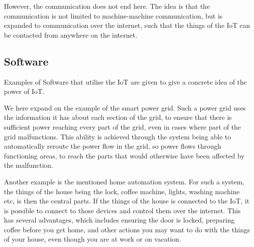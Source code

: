 However, the communication does not end here.
The idea is that the communication is not limited to machine-machine communication, but is expanded to communication over the internet, such that the things of the IoT can be contacted from anywhere on the internet.

\subsection{Software}
Examples of Software that utilise the IoT are given to give a concrete idea of the power of IoT.

We here expand on the example of the smart power grid.
Such a power grid uses the information it has about each section of the grid, to ensure that there is sufficient power reaching every part of the grid, even in cases where part of the grid malfunctions.
This ability is achieved through the system being able to automatically reroute the power flow in the grid, so power flows through functioning areas, to reach the parts that would otherwise have been affected by the malfunction.

Another example is the mentioned home automation system.
For such a system, the things of the house being the lock, coffee machine, lights, washing machine etc, is then the central parts.
If the things of the house is connected to the IoT, it is possible to connect to those devices and control them over the internet.
This has several advantages, which includes ensuring the door is locked, preparing coffee before you get home, and other actions you may want to do with the things of your house, even though you are at work or on vacation.